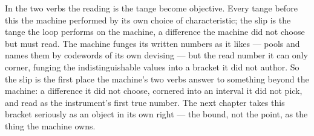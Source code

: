 In the two verbs the reading is the tange become objective. Every tange before this the machine performed by its own
choice of characteristic; the slip is the tange the loop performs on the machine, a difference the machine did not
choose but must read. The machine funges its written numbers as it likes --- pools and names them by codewords of its
own devising --- but the read number it can only corner, funging the indistinguishable values into a bracket it did not
author. So the slip is the first place the machine's two verbs answer to something beyond the machine: a difference it
did not choose, cornered into an interval it did not pick, and read as the instrument's first true number. The next
chapter takes this bracket seriously as an object in its own right --- the bound, not the point, as the thing the
machine owns.
